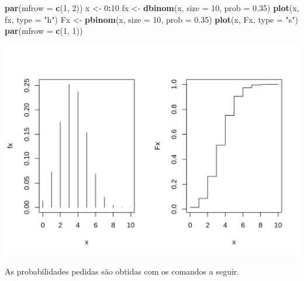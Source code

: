 \documentclass[10pt,a4paper]{book}
\newenvironment{Shaded}{\begin{snugshade}}{\end{snugshade}}
\newcommand{\KeywordTok}[1]{\textcolor[rgb]{0.13,0.29,0.53}{\textbf{#1}}}
\newcommand{\DataTypeTok}[1]{\textcolor[rgb]{0.13,0.29,0.53}{#1}}
\newcommand{\DecValTok}[1]{\textcolor[rgb]{0.00,0.00,0.81}{#1}}
\newcommand{\FloatTok}[1]{\textcolor[rgb]{0.00,0.00,0.81}{#1}}
\newcommand{\StringTok}[1]{\textcolor[rgb]{0.31,0.60,0.02}{#1}}
\newcommand{\OperatorTok}[1]{\textcolor[rgb]{0.81,0.36,0.00}{\textbf{#1}}}
\newcommand{\NormalTok}[1]{#1}
\begin{document}
\begin{Shaded}
\begin{Highlighting}[]
\KeywordTok{par}\NormalTok{(}\DataTypeTok{mfrow =} \KeywordTok{c}\NormalTok{(}\DecValTok{1}\NormalTok{, }\DecValTok{2}\NormalTok{))}
\NormalTok{x <-}\StringTok{ }\DecValTok{0}\OperatorTok{:}\DecValTok{10}
\NormalTok{fx <-}\StringTok{ }\KeywordTok{dbinom}\NormalTok{(x, }\DataTypeTok{size =} \DecValTok{10}\NormalTok{, }\DataTypeTok{prob =} \FloatTok{0.35}\NormalTok{)}
\KeywordTok{plot}\NormalTok{(x, fx, }\DataTypeTok{type =} \StringTok{"h"}\NormalTok{)}
\NormalTok{Fx <-}\StringTok{ }\KeywordTok{pbinom}\NormalTok{(x, }\DataTypeTok{size =} \DecValTok{10}\NormalTok{, }\DataTypeTok{prob =} \FloatTok{0.35}\NormalTok{)}
\KeywordTok{plot}\NormalTok{(x, Fx, }\DataTypeTok{type =} \StringTok{"s"}\NormalTok{)}
\KeywordTok{par}\NormalTok{(}\DataTypeTok{mfrow =} \KeywordTok{c}\NormalTok{(}\DecValTok{1}\NormalTok{, }\DecValTok{1}\NormalTok{))}
\end{Highlighting}
\end{Shaded}

\begin{center}\includegraphics{figures/unnamed-chunk-349-1} \end{center}

As probabilidades pedidas são obtidas com os comandos a seguir.
\end{document}
